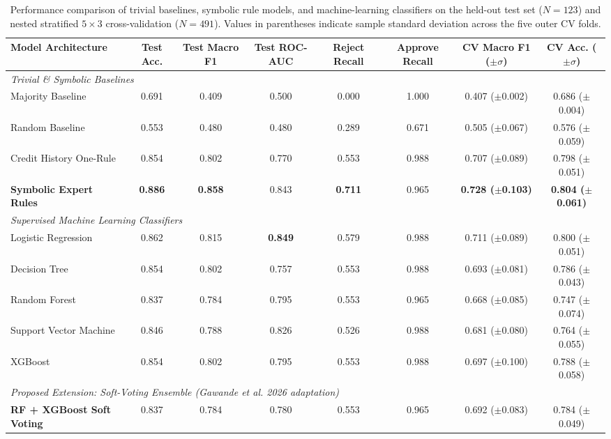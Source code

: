 \begin{table}[t]
\centering
\caption{Performance comparison of trivial baselines, symbolic rule models, and machine-learning classifiers on the held-out test set ($N=123$) and nested stratified $5\times 3$ cross-validation ($N=491$). Values in parentheses indicate sample standard deviation across the five outer CV folds.}
\label{tab:results}
\small
\begin{tabular}{lccccccc}
\toprule
\textbf{Model Architecture} & \textbf{Test Acc.} & \textbf{Test Macro F1} & \textbf{Test ROC-AUC} & \textbf{Reject Recall} & \textbf{Approve Recall} & \textbf{CV Macro F1 ($\pm \sigma$)} & \textbf{CV Acc. ($\pm \sigma$)} \\
\midrule
\multicolumn{8}{l}{\textit{Trivial \& Symbolic Baselines}} \\
Majority Baseline & 0.691 & 0.409 & 0.500 & 0.000 & 1.000 & 0.407 ($\pm$0.002) & 0.686 ($\pm$0.004) \\
Random Baseline & 0.553 & 0.480 & 0.480 & 0.289 & 0.671 & 0.505 ($\pm$0.067) & 0.576 ($\pm$0.059) \\
Credit History One-Rule & 0.854 & 0.802 & 0.770 & 0.553 & 0.988 & 0.707 ($\pm$0.089) & 0.798 ($\pm$0.051) \\
\textbf{Symbolic Expert Rules} & \textbf{0.886} & \textbf{0.858} & 0.843 & \textbf{0.711} & 0.965 & \textbf{0.728 ($\pm$0.103)} & \textbf{0.804 ($\pm$0.061)} \\
\midrule
\multicolumn{8}{l}{\textit{Supervised Machine Learning Classifiers}} \\
Logistic Regression & 0.862 & 0.815 & \textbf{0.849} & 0.579 & 0.988 & 0.711 ($\pm$0.089) & 0.800 ($\pm$0.051) \\
Decision Tree & 0.854 & 0.802 & 0.757 & 0.553 & 0.988 & 0.693 ($\pm$0.081) & 0.786 ($\pm$0.043) \\
Random Forest & 0.837 & 0.784 & 0.795 & 0.553 & 0.965 & 0.668 ($\pm$0.085) & 0.747 ($\pm$0.074) \\
Support Vector Machine & 0.846 & 0.788 & 0.826 & 0.526 & 0.988 & 0.681 ($\pm$0.080) & 0.764 ($\pm$0.055) \\
XGBoost & 0.854 & 0.802 & 0.795 & 0.553 & 0.988 & 0.697 ($\pm$0.100) & 0.788 ($\pm$0.058) \\
\midrule
\multicolumn{8}{l}{\textit{Proposed Extension: Soft-Voting Ensemble (Gawande et al. 2026 adaptation)}} \\
\textbf{RF + XGBoost Soft Voting} & 0.837 & 0.784 & 0.780 & 0.553 & 0.965 & 0.692 ($\pm$0.083) & 0.784 ($\pm$0.049) \\
\bottomrule
\end{tabular}
\end{table}